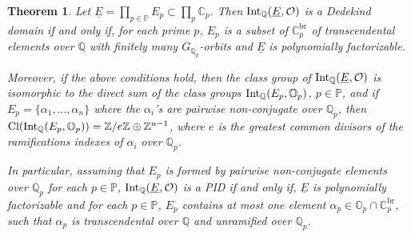\documentclass[10pt]{article}
\numberwithin{equation}{section}
\newtheorem{Thm}[equation]{Theorem}
\theoremstyle{definition}\newtheorem{Def}[equation]{Definition}
\theoremstyle{definition}\newtheorem{Ques}[equation]{Question}
\newcommand{\Q}{\mathbb{Q}}
\newcommand{\Z}{\mathbb{Z}}
\renewcommand{\O}{\mathbb{O}}
\newcommand{\C}{\mathbb{C}}
\newcommand{\PP}{\mathbb{P}}
\newcommand{\Int}{\textnormal{Int}}
\newcommand{\IntQ}{\Int_{\Q}}
\newcommand{\uE}{\underline{E}}
\begin{document}
\begin{Thm}\label{IntQEODed}
Let $\uE=\prod_{p\in\PP}E_p\subset\prod_p \C_p$. Then $\IntQ(\uE,\mathcal{O})$ is a Dedekind domain if and only if, for each prime $p$,  $E_p$ is a subset of $\C_p^{\text{br}}$ of transcendental elements over $\Q$ with finitely many $G_{\Q_p}$-orbits and $\uE$ is polynomially factorizable.

Moreover, if the above conditions hold, then the class group of $\IntQ(\uE,\mathcal{O})$ is isomorphic to the direct sum of the class groups $\IntQ(E_p,\O_p)$, $p\in\PP$, and if $E_p=\{\alpha_1,\ldots,\alpha_n\}$ where the $\alpha_i$'s are pairwise non-conjugate over $\Q_p$, then $\text{Cl}(\IntQ(E_p,\O_p))=\Z/e\Z\oplus\Z^{n-1}$, where $e$ is the greatest common divisors of the ramifications indexes of $\alpha_i$ over $\Q_p$.

In particular, assuming that $E_p$ is formed by pairwise non-conjugate elements over $\Q_p$ for each $p\in\PP$, $\IntQ(\uE,\mathcal{O})$ is a PID if and only if, $\uE$ is polynomially factorizable and for each $p\in\PP$, $E_p$ contains at most one element $\alpha_p\in \O_p\cap\C_p^{\text{br}}$, such that $\alpha_p$ is transcendental over $\Q$ and unramified over $\Q_p$.
\end{Thm}
\end{document}
